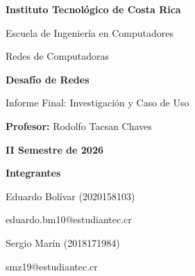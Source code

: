 \documentclass[12pt,a4paper]{article}
\begin{document}

\begin{titlepage}

    \centering
    \singlespacing
    \thispagestyle{empty}

    {\Large\bfseries
    Instituto Tecnológico de Costa Rica\par}

    \vspace{0.3cm}

    {\large
    Escuela de Ingeniería en Computadores\par}

    \vspace{0.3cm}

    {\large
    Redes de Computadoras\par}

    \vspace{2cm}

    {\LARGE\bfseries
    Desafío de Redes\par}

    \vspace{0.4cm}

    {\large
        Informe Final: Investigación y Caso de Uso\par}

    \vspace{1.5cm}

    \textbf{Profesor:} Rodolfo Tacsan Chaves\par

    \vspace{0.3cm}

    \textbf{II Semestre de 2026}\par

    \vspace{1.5cm}

    {\large\bfseries Integrantes\par}

    \vspace{0.6cm}

    Eduardo Bolívar (2020158103)\\
    {\small eduardo.bm10@estudiantec.cr\par}

    \vspace{0.4cm}

    Sergio Marín (2018171984)\\
    {\small smz19@estudiantec.cr\par}


\end{titlepage}
\end{document}
